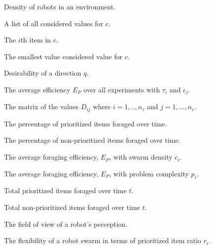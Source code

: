 \begin{description}


	\item[\parbox{\namewidth}{$c$}] Density of robots in an environment.
	
	\item[\parbox{\namewidth}{$\overline{c}$}] A list of all considered values for $c$.
		
	\item[\parbox{\namewidth}{$c_i$}] The $i$th item in $\overline{c}$.
	
	\item[\parbox{\namewidth}{$c_{min}$}] The smallest value considered value for $c$.
		
	\item[\parbox{\namewidth}{$d$}] Desirability of a direction $q$.

	\item[\parbox{\namewidth}{$D_{ij}$}] The average efficiency $E_P$ over all experiments with $\tau_i$ and $\epsilon_j$.
	
	\item[\parbox{\namewidth}{$D$}] The matrix of the values $D_{ij}$ where $i=1,..,n_\tau$ and $j=1,...,n_\epsilon$.

	\item[\parbox{\namewidth}{$E_P$}] The percentage of prioritized items foraged over time.
	
	\item[\parbox{\namewidth}{$E_{NP}$}] The percentage of non-prioritized items foraged over time.


	\item[\parbox{\namewidth}{$E_{c_i}$}] The average foraging efficiency, $E_P$, with swarm density $c_i$.
	
	\item[\parbox{\namewidth}{$E_{p_i}$}] The average foraging efficiency, $E_P$, with problem complexity $p_i$.

			
	\item[\parbox{\namewidth}{$E^t_P$}] Total prioritized items foraged over time $t$.	
	
	\item[\parbox{\namewidth}{$E^t_{NP}$}] Total non-prioritized items foraged over time $t$.	

	\item[\parbox{\namewidth}{$f$}] The	field of view of a robot's perception.

	\item[\parbox{\namewidth}{$F_{r_i}$}] The flexibility of a robot swarm in terms of prioritized item ratio $r_i$.
	

\end{description}
